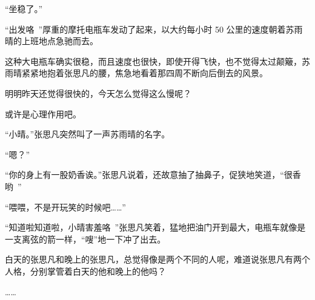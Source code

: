 “坐稳了。”

“出发咯~”厚重的摩托电瓶车发动了起来，以大约每小时 50 公里的速度朝着苏雨晴的上班地点急驰而去。

这种大电瓶车确实很稳，而且速度也很快，即使开得飞快，也不觉得太过颠簸，苏雨晴紧紧地抱着张思凡的腰，焦急地看着那四周不断向后倒去的风景。

明明昨天还觉得很快的，今天怎么觉得这么慢呢？

或许是心理作用吧。

“小晴。”张思凡突然叫了一声苏雨晴的名字。

“嗯？”

“你的身上有一股奶香诶。”张思凡说着，还故意抽了抽鼻子，促狭地笑道，“很香哟~”

“喂喂，不是开玩笑的时候吧……”

“知道啦知道啦，小晴害羞咯~”张思凡笑着，猛地把油门开到最大，电瓶车就像是一支离弦的箭一样，“嗖”地一下冲了出去。

白天的张思凡和晚上的张思凡，总觉得像是两个不同的人呢，难道说张思凡有两个人格，分别掌管着白天的他和晚上的他吗？

……
